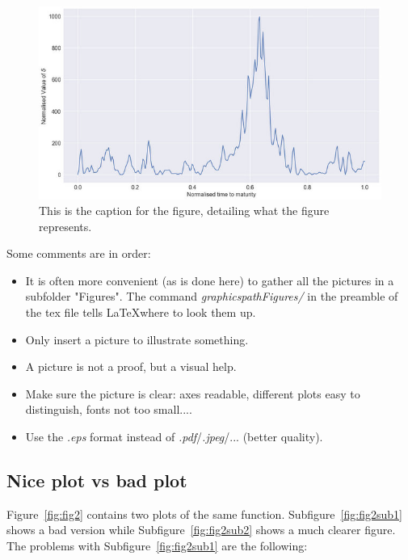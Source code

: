 \documentclass[a4paper, twoside]{report}
\theoremstyle{definition}
\numberwithin{equation}{section}
\begin{document}
\begin{figure}[h!]
  \centering
  \includegraphics[scale=0.4]{profileNorm.jpg}
  \caption{This is the caption for the figure, detailing what the figure represents.}
  \label{fig:Pict}
\end{figure}


Some comments are in order:
\begin{itemize}
  \item It is often more convenient (as is done here) to gather all the pictures in a subfolder "Figures". The command \emph{graphicspath{{Figures/}}} in the preamble of the tex file tells \LaTeX where to look them up.
  \item Only insert a picture to illustrate something.
  \item A picture is not a proof, but a visual help.
  \item Make sure the picture is clear: axes readable, different plots easy to distinguish, fonts not too small....
  \item Use the \emph{.eps} format instead of \emph{.pdf}/\emph{.jpeg}/... (better quality).
\end{itemize}

\subsection{Nice plot vs bad plot}

Figure~\ref{fig:fig2} contains two plots of the same function.
Subfigure~\ref{fig:fig2sub1} shows a bad version while Subfigure~\ref{fig:fig2sub2}
shows a much clearer figure.
The problems with Subfigure~\ref{fig:fig2sub1} are the following:
\end{document}
